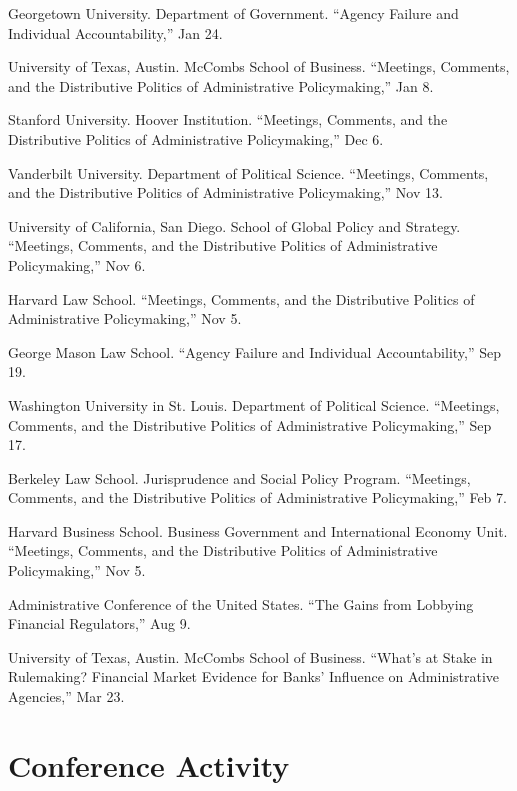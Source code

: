 \documentclass[12pt,letterpaper]{report}
\newcommand{\talk}[4]{\item[#1]{\tab{}#3. \enquote{#2,} #4.}} %
\begin{document}
    \begin{tablist}
    \talk{2020}{Agency Failure and Individual Accountability}{Georgetown University. Department of Government}{Jan 24}
    \talk{2020}{Meetings, Comments, and the Distributive Politics of Administrative Policymaking}{University of Texas, Austin. McCombs School of Business}{Jan 8}
    \talk{2019}{Meetings, Comments, and the Distributive Politics of Administrative Policymaking}{Stanford University. Hoover Institution}{Dec 6}
    \talk{2019}{Meetings, Comments, and the Distributive Politics of Administrative Policymaking}{Vanderbilt University. Department of Political Science}{Nov 13}
    \talk{2019}{Meetings, Comments, and the Distributive Politics of Administrative Policymaking}{University of California, San Diego. School of Global Policy and Strategy}{Nov 6}
    \talk{2019}{Meetings, Comments, and the Distributive Politics of Administrative Policymaking}{Harvard Law School}{Nov 5}    
    \talk{2019}{Agency Failure and Individual Accountability}{George Mason Law School}{Sep 19}
    \talk{2019}{Meetings, Comments, and the Distributive Politics of Administrative Policymaking}{Washington University in St. Louis. Department of Political Science}{Sep 17}    
    \talk{2019}{Meetings, Comments, and the Distributive Politics of Administrative Policymaking}{Berkeley Law School. Jurisprudence and Social Policy Program}{Feb 7}    
    \talk{2019}{Meetings, Comments, and the Distributive Politics of Administrative Policymaking}{Harvard Business School. Business Government and International Economy Unit}{Nov 5}   
    \talk{2019}{The Gains from Lobbying Financial Regulators}{Administrative Conference of the United States}{Aug 9}    
    \talk{2018}{What’s at Stake in Rulemaking? Financial Market Evidence for Banks’ Influence on Administrative Agencies}{University of Texas, Austin. McCombs School of Business}{Mar 23}
    
    \end{tablist}

    \section*{Conference Activity}
    
\end{document}
